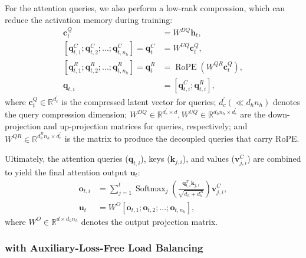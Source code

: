 For the attention queries, we also perform a low-rank compression, which can reduce the activation memory during training:
\begin{align}
    \mathbf{c}_{t}^{Q} &= W^{DQ} \mathbf{h}_{t}, \\
    [\mathbf{q}_{t, 1}^{C};\mathbf{q}_{t, 2}^{C};...;\mathbf{q}_{t, n_{h}}^{C}] = \mathbf{q}_{t}^{C} &= W^{UQ} \mathbf{c}_{t}^{Q}, \\
    [\mathbf{q}_{t, 1}^{R};\mathbf{q}_{t, 2}^{R};...;\mathbf{q}_{t, n_{h}}^{R}] = \mathbf{q}_{t}^{R} &= \operatorname{RoPE}({W^{QR}} \mathbf{c}_{t}^{Q}), \\
    \mathbf{q}_{t, i} &= [\mathbf{q}_{t, i}^{C}; \mathbf{q}_{t, i}^{R}],
\end{align}
where $\mathbf{c}_{t}^{Q} \in \mathbb{R}^{d_c^{\prime}}$ is the compressed latent vector for queries; 
$d_c^{\prime} (\ll d_h n_h)$ denotes the query compression dimension; 
$W^{DQ} \in \mathbb{R}^{d_c^{\prime} \times d}, W^{UQ} \in \mathbb{R}^{d_h n_h \times d_c^{\prime}}$ are the down-projection and up-projection matrices for queries, respectively;
and $W^{QR} \in \mathbb{R}^{d_h^R n_h \times d_c^{\prime}}$ is the matrix to produce the decoupled queries that carry RoPE. 

Ultimately, the attention queries ($\mathbf{q}_{t, i}$), keys ($\mathbf{k}_{j, i}$), and values ($\mathbf{v}_{j, i}^{C}$) are combined to yield the final attention output $\mathbf{u}_{t}$:
\begin{align}
    \mathbf{o}_{t, i} &= \sum_{j=1}^{t} \operatorname{Softmax}_j(\frac{\mathbf{q}_{t, i}^T \mathbf{k}_{j, i}}{\sqrt{d_{h} + d_{h}^{R}}}) \mathbf{v}_{j, i}^{C}, \\
    \mathbf{u}_{t} &= W^{O} [\mathbf{o}_{t, 1};\mathbf{o}_{t, 2};...;\mathbf{o}_{t, n_{h}}],
\end{align}
where $W^{O} \in \mathbb{R}^{d \times d_h n_h}$ denotes the output projection matrix. 

\subsubsection{\dsmoe{} with Auxiliary-Loss-Free Load Balancing}

